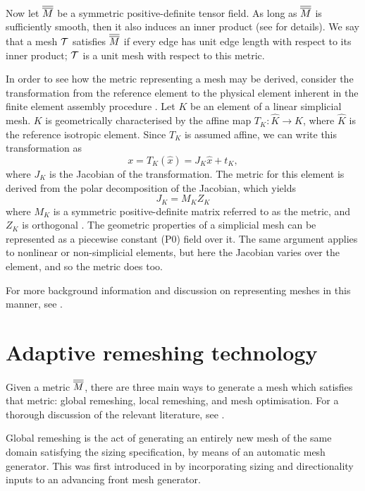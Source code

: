 Now let $\overline{\overline{M}}$ be a symmetric positive-definite tensor field. As long as
$\overline{\overline{M}}$ is sufficiently smooth, then it also induces an inner product
(see \citet{simpson1994} for details). We say that a mesh $\cal{T}$ satisfies
$\overline{\overline{M}}$ if every edge has unit edge length with respect to its inner product;
$\cal{T}$ is a unit mesh with respect to this metric.

In order to see how the metric representing a mesh may be derived, consider the transformation from the reference element to the physical
element inherent in the finite element assembly procedure \citep{femtools}. 
Let $K$ be an element of a linear simplicial mesh. $K$ is geometrically characterised by the affine map
$T_K: \hat{K} \rightarrow K$, where $\hat{K}$ is the reference isotropic element. Since
$T_K$ is assumed affine, we can write this transformation as
\begin{equation}
x = T_K(\hat{x}) = J_K\hat{x} + t_K,
\end{equation}
where $J_K$ is the Jacobian of the transformation. The metric for this element is derived
from the polar decomposition of the Jacobian, which yields
\begin{equation}
J_K = M_K Z_K
\end{equation}
where $M_K$ is a symmetric positive-definite matrix referred to as the metric,
and $Z_K$ is orthogonal \citep{micheletti2006}. The geometric properties of a simplicial mesh can be represented
as a piecewise constant (P0) field over it. The same argument applies to
nonlinear or non-simplicial elements, but here the Jacobian varies over the element,
and so the metric does too.

For more background information and discussion on representing meshes in this manner,
see \citet{george1998}.

\section{Adaptive remeshing technology} \label{sec:adaptive_remeshing_technology}
Given a metric $\overline{\overline{M}}$, there are three main ways to generate a mesh which satisfies
that metric: global remeshing, local remeshing, and mesh optimisation. For a thorough discussion
of the relevant literature, see \citet{farrell2009i}.

Global remeshing is the act of generating an entirely new mesh of the same domain satisfying the sizing
specification, by means of an automatic mesh generator. This was first introduced in \citet{peraire1987} by incorporating 
sizing and directionality inputs to an advancing front mesh generator.

